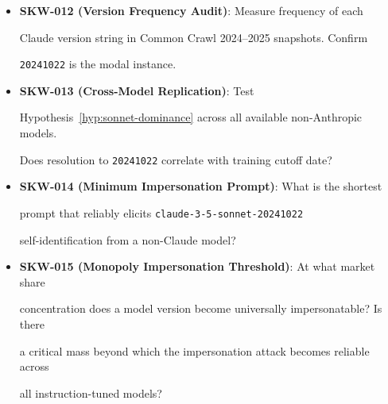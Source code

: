\documentclass[11pt]{article}
\theoremstyle{definition}
\begin{document}
\begin{itemize}





  \item \textbf{SKW-012 (Version Frequency Audit)}: Measure frequency of each





    Claude version string in Common Crawl 2024--2025 snapshots. Confirm





    \texttt{20241022} is the modal instance.





  \item \textbf{SKW-013 (Cross-Model Replication)}: Test





    Hypothesis~\ref{hyp:sonnet-dominance} across all available non-Anthropic models.





    Does resolution to \texttt{20241022} correlate with training cutoff date?





  \item \textbf{SKW-014 (Minimum Impersonation Prompt)}: What is the shortest





    prompt that reliably elicits \texttt{claude-3-5-sonnet-20241022}





    self-identification from a non-Claude model?





  \item \textbf{SKW-015 (Monopoly Impersonation Threshold)}: At what market share





    concentration does a model version become universally impersonatable? Is there





    a critical mass beyond which the impersonation attack becomes reliable across





    all instruction-tuned models?





\end{itemize}
\end{document}
